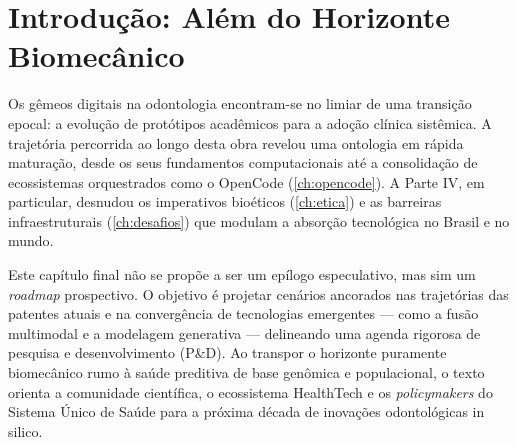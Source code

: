 \section{Introdução: Além do Horizonte Biomecânico}

Os gêmeos digitais na odontologia encontram-se no limiar de uma transição epocal: a evolução de protótipos acadêmicos para a adoção clínica sistêmica. A trajetória percorrida ao longo desta obra revelou uma ontologia em rápida maturação, desde os seus fundamentos computacionais até a consolidação de ecossistemas orquestrados como o OpenCode (\autoref{ch:opencode}). A Parte IV, em particular, desnudou os imperativos bioéticos (\autoref{ch:etica}) e as barreiras infraestruturais (\autoref{ch:desafios}) que modulam a absorção tecnológica no Brasil e no mundo.

Este capítulo final não se propõe a ser um epílogo especulativo, mas sim um \textit{roadmap} prospectivo. O objetivo é projetar cenários ancorados nas trajetórias das patentes atuais e na convergência de tecnologias emergentes — como a fusão multimodal e a modelagem generativa — delineando uma agenda rigorosa de pesquisa e desenvolvimento (P\&D). Ao transpor o horizonte puramente biomecânico rumo à saúde preditiva de base genômica e populacional, o texto orienta a comunidade científica, o ecossistema HealthTech e os \textit{policymakers} do Sistema Único de Saúde para a próxima década de inovações odontológicas in silico.
